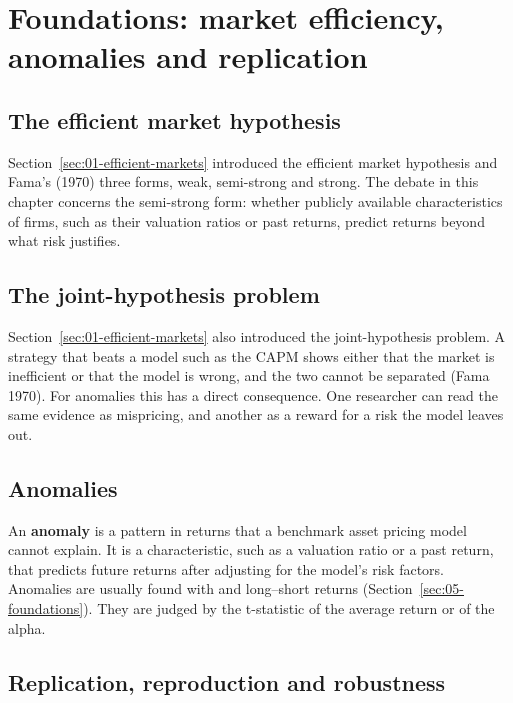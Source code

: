 \section{Foundations: market efficiency, anomalies and replication}
\label{sec:19-foundations}

\subsection{The efficient market hypothesis}

Section~\ref{sec:01-efficient-markets} introduced the efficient market hypothesis and Fama's (1970) three forms, weak, semi-strong and strong. The debate in this chapter concerns the semi-strong form: whether publicly available characteristics of firms, such as their valuation ratios or past returns, predict returns beyond what risk justifies.

\subsection{The joint-hypothesis problem}

Section~\ref{sec:01-efficient-markets} also introduced the joint-hypothesis problem. A strategy that beats a model such as the CAPM shows either that the market is inefficient or that the model is wrong, and the two cannot be separated (Fama 1970). For anomalies this has a direct consequence. One researcher can read the same evidence as mispricing, and another as a reward for a risk the model leaves out.

\subsection{Anomalies}

An \textbf{anomaly} is a pattern in returns that a benchmark asset pricing model cannot explain. It is a characteristic, such as a valuation ratio or a past return, that predicts future returns after adjusting for the model's risk factors. Anomalies are usually found with  and long--short returns (Section~\ref{sec:05-foundations}). They are judged by the t-statistic of the average return or of the alpha.

\subsection{Replication, reproduction and robustness}

